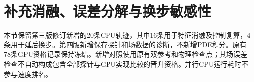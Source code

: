 \section{补充消融、误差分解与换步敏感性}
\label{sec:review-experiments}

本节保留第三版修订新增的20条CPU轨迹，其中16条用于特征消融及控制复算，4条用于延后换步。第四版新增保存探针和场数据的诊断，不新增PDE积分。原有78条GPU资格记录保持冻结。新增对照使用原有双参考和物理检查点；其场误差检查不自动构成包含全部探针与GPU实现比较的晋升资格。并行CPU运行耗时不参与速度排名。




\FloatBarrier

